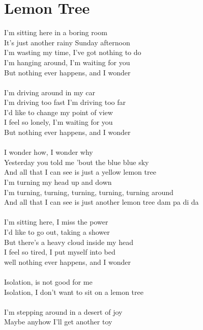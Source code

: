 \section{Lemon Tree}
I'm sitting here in a boring room\\
It's just another rainy Sunday afternoon\\
I'm wasting my time, I've got nothing to do\\
I'm hanging around, I'm waiting for you\\
But nothing ever happens, and I wonder\\
\\
I'm driving around in my car\\
I'm driving too fast I'm driving too far\\
I'd like to change my point of view\\
I feel so lonely, I'm waiting for you\\
But nothing ever happens, and I wonder\\
\\
I wonder how, I wonder why\\
Yesterday you told me 'bout the blue blue sky\\
And all that I can see is just a yellow lemon tree\\
I'm turning my head up and down\\
I'm turning, turning, turning, turning, turning around\\
And all that I can see is just another lemon tree   dam pa di da\\
\\
I'm sitting here, I miss the power\\
I'd like to go out, taking a shower\\
But there's a heavy cloud inside my head\\
I feel so tired, I put myself into bed\\
well nothing ever happens, and I wonder\\
\\
Isolation, is not good for me\\
Isolation, I don't want to sit on a lemon tree\\
\\
I'm stepping around in a desert of joy\\
Maybe anyhow I'll get another toy\\
